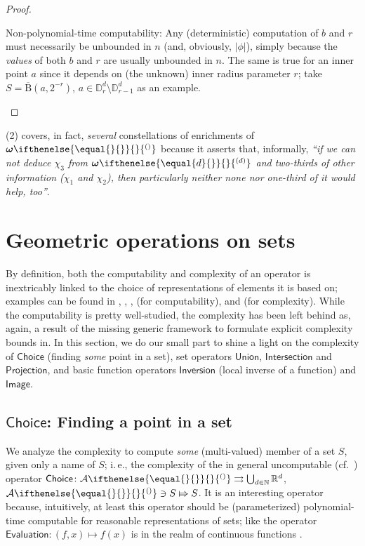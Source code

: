 \documentclass{CSML}
\newcommand{\representation}[2]{ #1\ifnotempty{#2}{^{(#2)}} }
\newcommand{\ID}{\mathbb{D}}
\newcommand{\IN}{\mathbb{N}}
\newcommand{\IR}{\mathbb{R}}
\newcommand{\wmemrep}[1][\empty]{ \representation{\bm{\omega}}{#1} }
\newcommand{\closedset}[1][\empty]{ \representation{\mathcal{A}}{#1} }
\newcommand{\ifnotempty}[2]{ \ifthenelse{ \equal{#1}{\empty} }{}{#2} }
\newcommand{\ball}{\mathrm{B}}
\newcommand{\cls}[1]{\overline{#1}}
\newcommand{\cball}{\cls{\ball}}
\newcommand{\mto}{\rightrightarrows}
\newcommand{\mmapsto}{\Mapsto}
\newcommand{\ie}{\mbox{i.\,e.}\xspace}
\newcommand{\dsoch}{\mathsf{Choice}}
\newcommand{\dsocap}{\mathsf{Intersection}}
\newcommand{\dsocup}{\mathsf{Union}}
\newcommand{\dsoinv}{\mathsf{Inversion}}
\newcommand{\dsoimg}{\mathsf{Image}}
\begin{document}
\begin{proof}
\begin{enumerate}
	Non-polynomial-time computability:
	Any (deterministic) computation of $b$ and $r$ must necessarily be
	unbounded in $n$ (and, obviously, $|\phi|$), simply because the
	\emph{values} of both $b$ and $r$ are usually unbounded in $n$.
	The same is true for an inner point $a$ since it depends on (the
	unknown) inner radius parameter $r$; take $S = \cball(a,2^{-r})$,
	$a \in \ID^d_r \setminus \ID^d_{r-1}$ as an example.
%
\qedhere
\end{enumerate}
\end{proof}

(2) covers, in fact,
\emph{several} constellations of enrichments of $\wmemrep$ because it asserts that,
informally, \emph{``if we can not deduce $\chi_3$ from $\wmemrep[d]$ and
two-thirds of other information ($\chi_1$ and $\chi_2$), then particularly
neither none nor one-third of it would help, too''}.


\section{Geometric operations on sets} \label{sec:operators}


By definition, both the computability and complexity of an operator is
inextricably linked to the choice of representations of elements it is based
on; examples can be found in \cite{Brattka99}, \cite[Thm.~5.1.13]{Weih00},
\cite{Ziegler02}, \cite{ziegler2004linalg} (for computability), and
\cite{ZM08} (for complexity). While the computability is pretty well-studied,
the complexity has been left
behind as, again, a result of the missing generic framework to formulate
explicit complexity bounds in.
In this section, we do our small part to shine a light on the complexity of
$\dsoch$ (finding \emph{some} point in a set), set operators $\dsocup$,
$\dsocap$ and $\mathsf{Projection}$, and basic function operators $\dsoinv$
(local inverse of a function) and $\dsoimg$.


\subsection{\texorpdfstring{{$\dsoch$}}{Choice}: Finding a point in a set}


We analyze the complexity to compute \emph{some} (multi-valued) member of a
set $S$, given only a name of $S$; \ie, the complexity of the in general
uncomputable (cf.~\cite{BG11,BBP12}) operator
$\dsoch \colon \closedset \mto \bigcup_{d\in\IN} \IR^d$,
$\closedset \ni S \mmapsto S$.
It is an interesting operator because, intuitively, at least this operator
should be (parameterized) polynomial-time computable for reasonable
representations of sets; like the operator
$\mathsf{Evaluation} \colon (f,x) \mapsto f(x)$ is in the realm of continuous
functions \cite{KawamuraCook}.
\end{document}
